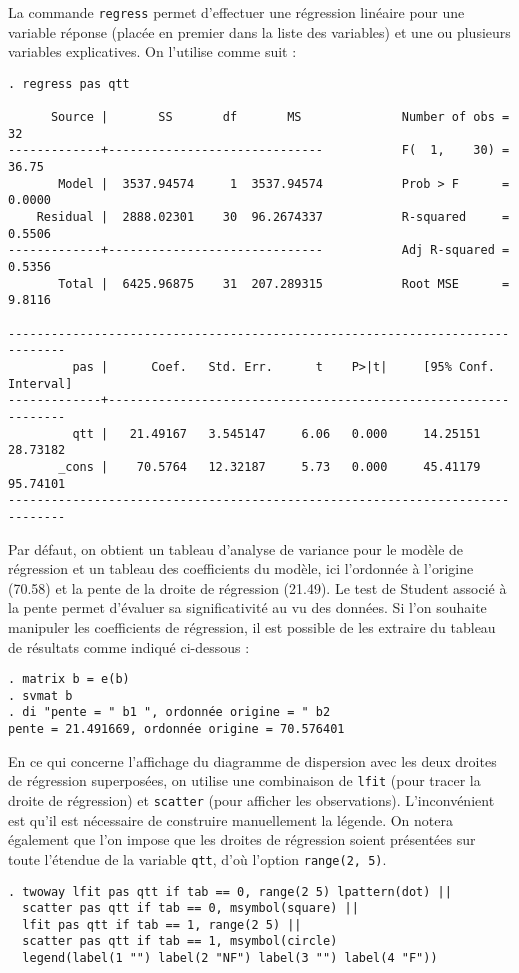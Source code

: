 La commande \texttt{regress} permet d'effectuer une régression linéaire
pour une variable réponse (placée en premier dans la liste des variables) et
une ou plusieurs variables explicatives. On l'utilise comme suit :
\begin{verbatim}
. regress pas qtt

      Source |       SS       df       MS              Number of obs =      32
-------------+------------------------------           F(  1,    30) =   36.75
       Model |  3537.94574     1  3537.94574           Prob > F      =  0.0000
    Residual |  2888.02301    30  96.2674337           R-squared     =  0.5506
-------------+------------------------------           Adj R-squared =  0.5356
       Total |  6425.96875    31  207.289315           Root MSE      =  9.8116

------------------------------------------------------------------------------
         pas |      Coef.   Std. Err.      t    P>|t|     [95% Conf. Interval]
-------------+----------------------------------------------------------------
         qtt |   21.49167   3.545147     6.06   0.000     14.25151    28.73182
       _cons |    70.5764   12.32187     5.73   0.000     45.41179    95.74101
------------------------------------------------------------------------------
\end{verbatim}
Par défaut, on obtient un tableau d'analyse de variance pour le modèle de
régression et un tableau des coefficients du modèle, ici l'ordonnée à
l'origine (70.58) et la pente de la droite de régression (21.49). Le test
de Student associé à la pente permet d'évaluer sa significativité au vu des
données. Si l'on souhaite manipuler les coefficients de régression, il est
possible de les extraire du tableau de résultats comme indiqué ci-dessous :
\begin{verbatim}
. matrix b = e(b)
. svmat b
. di "pente = " b1 ", ordonnée origine = " b2
pente = 21.491669, ordonnée origine = 70.576401
\end{verbatim}

En ce qui concerne l'affichage du diagramme de dispersion avec les deux
droites de régression superposées, on utilise une combinaison de
\texttt{lfit} (pour tracer la droite de régression) et \texttt{scatter}
(pour afficher les observations). L'inconvénient est qu'il est nécessaire de
construire manuellement la légende. On notera également que l'on impose que
les droites de régression soient présentées sur toute l'étendue de la
variable \texttt{qtt}, d'où l'option \texttt{range(2, 5)}. \label{para:twoway}
\begin{verbatim}
. twoway lfit pas qtt if tab == 0, range(2 5) lpattern(dot) || 
  scatter pas qtt if tab == 0, msymbol(square) || 
  lfit pas qtt if tab == 1, range(2 5) ||
  scatter pas qtt if tab == 1, msymbol(circle) 
  legend(label(1 "") label(2 "NF") label(3 "") label(4 "F"))
\end{verbatim}

